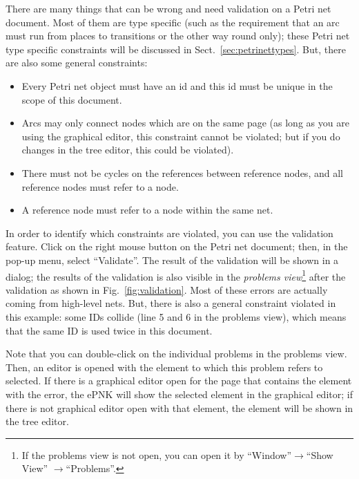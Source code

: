 There are many things that can be wrong and need validation
on a Petri net document. Most of them are type specific (such as the requirement
that an arc must run from places to transitions or the other way round only);
these Petri net type specific constraints will be discussed in
Sect.~\ref{sec:petrinettypes}. But, there are also some general constraints:
\begin{itemize}
  \item Every Petri net object must have an id and this id must be
        unique in the scope of this document.
        
  \item Arcs may only connect nodes which are on the same page (as
        long as you are using the graphical editor, this constraint
        cannot be violated; but if you do changes in the tree editor,
        this could be violated).
        
  \item There must not be cycles on the references between reference
        nodes, and all reference nodes must refer to a node.
        
  \item A reference node must refer to a node within
        the same net.  
\end{itemize}

In order to identify which constraints are violated, you can use the
validation feature. Click on the right mouse button on the Petri net
document; then, in the pop-up menu, select ``Validate''. The result
of the validation will be shown in a dialog; the results of the validation
is also visible in the \emph{problems view}\footnote
  {If the problems view is not open, you can open it by
   ``Window''$\rightarrow$``Show View'' $\rightarrow$``Problems''.}%
after the validation as shown in Fig.~\ref{fig:validation}. Most of these
errors are actually coming from high-level nets. But, there is also a general
constraint violated in this example: some IDs collide (line 5 and 6 in the
problems view), which means that the same ID is used twice in this document.

Note that you can double-click on the individual problems in the problems
view. Then, an editor is opened with the element to which this problem refers to
selected. If there is a graphical editor open for the page that contains 
the element with the error, the ePNK will show the selected element in the
graphical editor; if there is not graphical editor open with that element,
the element will be shown in the tree editor. 

